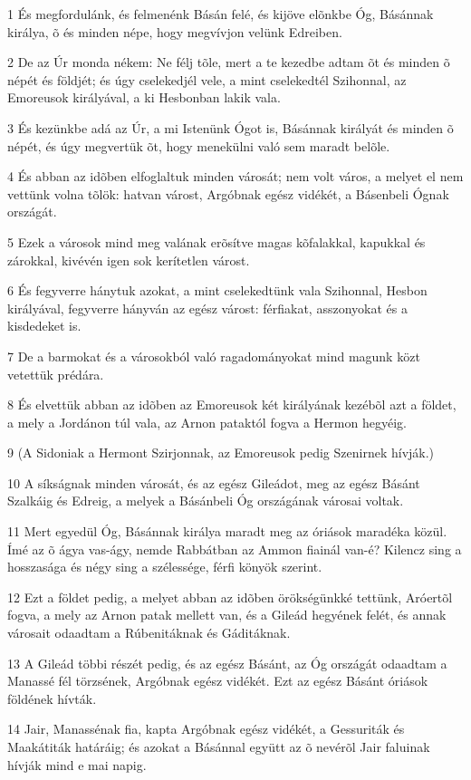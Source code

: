 \par 1 És megfordulánk, és felmenénk Básán felé, és kijöve elõnkbe Óg, Básánnak királya, õ és minden népe, hogy megvívjon velünk Edreiben.
\par 2 De az Úr monda nékem: Ne félj tõle, mert a te kezedbe adtam õt és minden õ népét és földjét; és úgy cselekedjél vele, a mint cselekedtél Szihonnal, az Emoreusok királyával, a ki Hesbonban lakik vala.
\par 3 És kezünkbe adá az Úr, a mi Istenünk Ógot is, Básánnak királyát és minden õ népét, és úgy megvertük õt, hogy menekülni való sem maradt belõle.
\par 4 És abban az idõben elfoglaltuk minden városát; nem volt város, a melyet el nem vettünk volna tõlök: hatvan várost, Argóbnak egész vidékét, a Básenbeli Ógnak országát.
\par 5 Ezek a városok mind meg valának erõsítve magas kõfalakkal, kapukkal és zárokkal, kivévén igen sok kerítetlen várost.
\par 6 És fegyverre hánytuk azokat, a mint cselekedtünk vala Szihonnal, Hesbon királyával, fegyverre hányván az egész várost: férfiakat, asszonyokat és a kisdedeket is.
\par 7 De a barmokat és a városokból való ragadományokat mind magunk közt vetettük prédára.
\par 8 És elvettük abban az idõben az Emoreusok két királyának kezébõl azt a földet, a mely a Jordánon túl vala, az Arnon pataktól fogva a Hermon hegyéig.
\par 9 (A Sidoniak a Hermont Szirjonnak, az Emoreusok pedig Szenirnek hívják.)
\par 10 A síkságnak minden városát, és az egész Gileádot, meg az egész Básánt Szalkáig és Edreig, a melyek a Básánbeli Óg országának városai voltak.
\par 11 Mert egyedül Óg, Básánnak királya maradt meg az óriások maradéka közül. Ímé az õ ágya vas-ágy, nemde Rabbátban az Ammon fiainál van-é? Kilencz sing a hosszasága és négy sing a szélessége, férfi könyök szerint.
\par 12 Ezt a földet pedig, a melyet abban az idõben örökségünkké tettünk, Aróertõl fogva, a mely az Arnon patak mellett van, és a Gileád hegyének felét, és annak városait odaadtam a Rúbenitáknak és Gáditáknak.
\par 13 A Gileád többi részét pedig, és az egész Básánt, az Óg országát odaadtam a Manassé fél törzsének, Argóbnak egész vidékét. Ezt az egész Básánt óriások földének hívták.
\par 14 Jair, Manassénak fia, kapta Argóbnak egész vidékét, a Gessuriták és Maakátiták határáig; és azokat a Básánnal együtt az õ nevérõl Jair faluinak hívják mind e mai napig.
